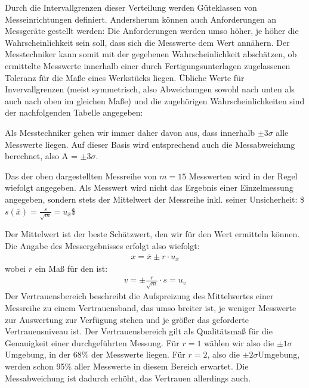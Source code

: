 \documentclass[letterpaper,10pt,english]{jupyterBook}
\begin{document}
\sphinxAtStartPar
Durch die Intervallgrenzen dieser Verteilung werden Güteklassen von Messeinrichtungen definiert. Andersherum können auch Anforderungen an Messgeräte gestellt werden: Die Anforderungen werden umso höher, je höher die Wahrscheinlichkeit sein soll, dass sich die Messwerte dem  Wert annähern.
Der Messtechniker kann somit mit der gegebenen Wahrscheinlichkeit abschätzen, ob ermittelte Messwerte innerhalb einer durch Fertigungsunterlagen zugelassenen Toleranz für die Maße eines Werkstücks liegen. Übliche Werte für Invervallgrenzen (meist symmetrisch, also Abweichungen sowohl nach unten als auch nach oben im gleichen Maße) und die zugehörigen Wahrscheinlichkeiten sind der nachfolgenden Tabelle angegeben:

\sphinxAtStartPar
{}

\sphinxAtStartPar
Als Messtechniker gehen wir immer daher davon aus, dass innerhalb \(\pm 3\sigma\) alle Messwerte liegen. Auf dieser Basis wird entsprechend auch die Messabweichung berechnet, also A = \(\pm 3\sigma\).

\sphinxAtStartPar
Das  der oben dargestellten Messreihe von \(m = 15\) Messwerten wird in der Regel wiefolgt angegeben. Als Messwert wird nicht das Ergebnis einer Einzelmessung angegeben, sondern stets der Mittelwert der Messreihe inkl. seiner Unsicherheit:
\$\( s(\overline x) = \frac{s}{\sqrt{m}} = u_{\overline x} \)\$

\sphinxAtStartPar
Der Mittelwert ist der beste Schätzwert, den wir für den  Wert ermitteln können. Die Angabe des Messergebnisses erfolgt also wiefolgt:
\begin{equation*}
\begin{split}x = \overline x \pm r \cdot u_{\overline x}\end{split}
\end{equation*}
\sphinxAtStartPar
wobei \(r\) ein Maß für den  ist:
\begin{equation*}
\begin{split}v = \pm \frac{r}{\sqrt{m}}\cdot s = u_v\end{split}
\end{equation*}
\sphinxAtStartPar
Der Vertrauensbereich beschreibt die Aufspreizung des Mittelwertes einer Messreihe zu einem Vertrauensband, das umso breiter ist, je weniger Messwerte zur Auswertung zur Verfügung stehen und je größer das geforderte Vertrauensniveau ist.
Der Vertrauensbereich gilt als Qualitätsmaß für die Genauigkeit einer durchgeführten Messung.
Für \(r=1\) wählen wir also die \(\pm 1\sigma\)\sphinxhyphen{}Umgebung, in der 68\% der Messwerte liegen. Für \(r = 2\), also die \(\pm 2\sigma\)\sphinxhyphen{}Umgebung, werden schon 95\% aller Messwerte in diesem Bereich erwartet. Die Messabweichung ist dadurch erhöht, das Vertrauen allerdings auch.
\end{document}
